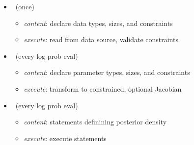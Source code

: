 \documentclass[10pt]{report}
\newcommand{\sld}[1]{\newpage{\noindent\LARGE \ \ \
    \textcolor{MidnightBlue}{\bfseries #1}}\vspace*{4pt}}
\newcommand{\myemph}[1]{{\color{MidnightBlue}{\bfseries #1}}}
\begin{document}
\begin{itemize}
\item \myemph{\tt\bfseries data} \ (once) 
\vspace*{-4pt}
\begin{itemize}\small
\item {\slshape content}: declare data types, sizes, and constraints
\item {\slshape execute}: read from data source, validate constraints
\end{itemize}
%
\item \myemph{\tt\bfseries parameters} \ (every log prob eval)
\vspace*{-4pt}
\begin{itemize}\small
\item {\slshape content}: declare parameter types, sizes, and constraints
\item {\slshape execute}: transform to constrained, optional Jacobian
\end{itemize}
%
\item \myemph{\tt\bfseries model} \ (every log prob eval) 
\vspace*{-4pt}
\begin{itemize}\small
\item {\slshape content}: statements definining posterior density
\item {\slshape execute}: execute statements
\end{itemize}
\end{itemize}

\sld{Derived Variable Blocks}
\end{document}
